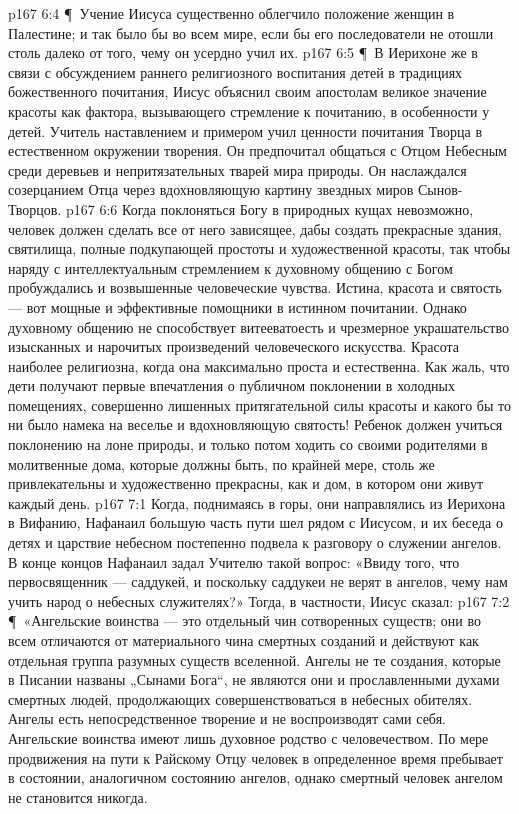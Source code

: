 \vs p167 6:4 \P\ Учение Иисуса существенно облегчило положение женщин в Палестине; и так было бы во всем мире, если бы его последователи не отошли столь далеко от того, чему он усердно учил их.
\vs p167 6:5 \P\ В Иерихоне же в связи с обсуждением раннего религиозного воспитания детей в традициях божественного почитания, Иисус объяснил своим апостолам великое значение красоты как фактора, вызывающего стремление к почитанию, в особенности у детей. Учитель наставлением и примером учил ценности почитания Творца в естественном окружении творения. Он предпочитал общаться с Отцом Небесным среди деревьев и непритязательных тварей мира природы. Он наслаждался созерцанием Отца через вдохновляющую картину звездных миров Сынов\hyp{}Творцов.
\vs p167 6:6 Когда поклоняться Богу в природных кущах невозможно, человек должен сделать все от него зависящее, дабы создать прекрасные здания, святилища, полные подкупающей простоты и художественной красоты, так чтобы наряду с интеллектуальным стремлением к духовному общению с Богом пробуждались и возвышенные человеческие чувства. Истина, красота и святость --- вот мощные и эффективные помощники в истинном почитании. Однако духовному общению не способствует витееватоесть и чрезмерное украшательство изысканных и нарочитых произведений человеческого искусства. Красота наиболее религиозна, когда она максимально проста и естественна. Как жаль, что дети получают первые впечатления о публичном поклонении в холодных помещениях, совершенно лишенных притягательной силы красоты и какого бы то ни было намека на веселье и вдохновляющую святость! Ребенок должен учиться поклонению на лоне природы, и только потом ходить со своими родителями в молитвенные дома, которые должны быть, по крайней мере, столь же привлекательны и художественно прекрасны, как и дом, в котором они живут каждый день.
\vs p167 7:1 Когда, поднимаясь в горы, они направлялись из Иерихона в Вифанию, Нафанаил большую часть пути шел рядом с Иисусом, и их беседа о детях и царствие небесном постепенно подвела к разговору о служении ангелов. В конце концов Нафанаил задал Учителю такой вопрос: «Ввиду того, что первосвященник --- саддукей, и поскольку саддукеи не верят в ангелов, чему нам учить народ о небесных служителях?» Тогда, в частности, Иисус сказал:
\vs p167 7:2 \P\ «Ангельские воинства --- это отдельный чин сотворенных существ; они во всем отличаются от материального чина смертных созданий и действуют как отдельная группа разумных существ вселенной. Ангелы не те создания, которые в Писании названы „Сынами Бога“, не являются они и прославленными духами смертных людей, продолжающих совершенствоваться в небесных обителях. Ангелы есть непосредственное творение и не воспроизводят сами себя. Ангельские воинства имеют лишь духовное родство с человечеством. По мере продвижения на пути к Райскому Отцу человек в определенное время пребывает в состоянии, аналогичном состоянию ангелов, однако смертный человек ангелом не становится никогда.
